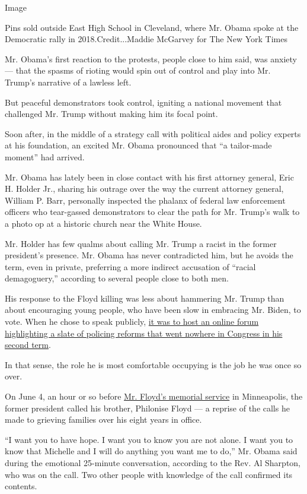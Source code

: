 Image

Pins sold outside East High School in Cleveland, where Mr. Obama spoke
at the Democratic rally in 2018.Credit...Maddie McGarvey for The New
York Times

Mr. Obama's first reaction to the protests, people close to him said,
was anxiety --- that the spasms of rioting would spin out of control and
play into Mr. Trump's narrative of a lawless left.

But peaceful demonstrators took control, igniting a national movement
that challenged Mr. Trump without making him its focal point.

Soon after, in the middle of a strategy call with political aides and
policy experts at his foundation, an excited Mr. Obama pronounced that
``a tailor-made moment'' had arrived.

Mr. Obama has lately been in close contact with his first attorney
general, Eric H. Holder Jr., sharing his outrage over the way the
current attorney general, William P. Barr, personally inspected the
phalanx of federal law enforcement officers who tear-gassed
demonstrators to clear the path for Mr. Trump's walk to a photo op at a
historic church near the White House.

Mr. Holder has few qualms about calling Mr. Trump a racist in the former
president's presence. Mr. Obama has never contradicted him, but he
avoids the term, even in private, preferring a more indirect accusation
of ``racial demagoguery,'' according to several people close to both
men.

His response to the Floyd killing was less about hammering Mr. Trump
than about encouraging young people, who have been slow in embracing Mr.
Biden, to vote. When he chose to speak publicly,
\href{https://www.nytimes.com/2020/06/23/us/politics/obama-biden-fundraiser.html}{it
was to host an online forum highlighting a slate of policing reforms
that went nowhere in Congress in his second term}.

In that sense, the role he is most comfortable occupying is the job he
was once so over.

On June 4, an hour or so before
\href{https://www.nytimes.com/2020/06/04/us/floyd-memorial-funeral.html}{Mr.
Floyd's memorial service} in Minneapolis, the former president called
his brother, Philonise Floyd --- a reprise of the calls he made to
grieving families over his eight years in office.

``I want you to have hope. I want you to know you are not alone. I want
you to know that Michelle and I will do anything you want me to do,''
Mr. Obama said during the emotional 25-minute conversation, according to
the Rev. Al Sharpton, who was on the call. Two other people with
knowledge of the call confirmed its contents.


